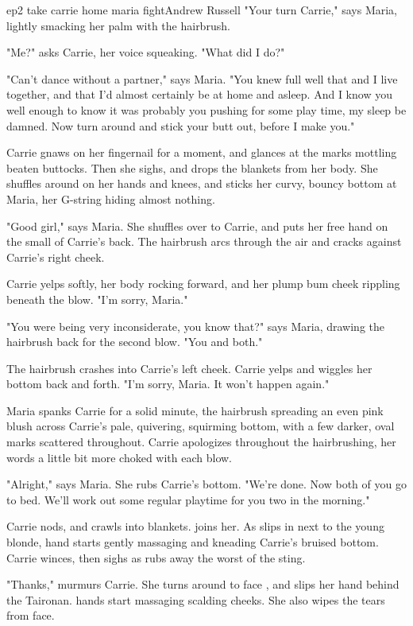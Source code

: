 \documentclass{book}
\begin{document}
\begin{childnode}{ep2 take carrie home maria fight}{Andrew Russell}
    "Your turn Carrie," says Maria, lightly smacking her palm with the hairbrush.

    "Me?" asks Carrie, her voice squeaking. "What did I do?"

    "Can't dance without a partner," says Maria. "You knew full well that \name{} and I live together, and that I'd almost certainly be at home and asleep. And I know you well enough to know it was probably you pushing for some play time, my sleep be damned. Now turn 
    around and stick your butt out, before I make you."
    
    Carrie gnaws on her fingernail for a moment, and glances at the marks mottling \names{} beaten buttocks. Then she sighs, and drops the blankets from her body. She shuffles around on her hands and knees, and sticks her curvy, bouncy bottom at Maria, her 
    G-string hiding almost nothing.
    
    "Good girl," says Maria. She shuffles over to Carrie, and puts her free hand on the small of Carrie's back. The hairbrush arcs through the air and cracks against Carrie's right cheek.

    Carrie yelps softly, her body rocking forward, and her plump bum cheek rippling beneath the blow. "I'm sorry, Maria."

    "You were being very inconsiderate, you know that?" says Maria, drawing the hairbrush back for the second blow. "You and \name{} both."

    The hairbrush crashes into Carrie's left cheek. Carrie yelps and wiggles her bottom back and forth. "I'm sorry, Maria. It won't happen again."

    Maria spanks Carrie for a solid minute, the hairbrush spreading an even pink blush across Carrie's pale, quivering, squirming bottom, with a few darker, oval marks scattered throughout. Carrie apologizes throughout the hairbrushing, her words a little bit more 
    choked with each blow.

    "Alright," says Maria. She rubs Carrie's bottom. "We're done. Now both of you go to bed. We'll work out some regular playtime for you two in the morning."

    Carrie nods, and crawls into \names{} blankets. \name{} joins her. As \heshe{} slips in next to the young blonde, \hisher{} hand starts gently massaging
    and kneading Carrie's bruised bottom. Carrie winces, then sighs as \name{} rubs away the worst of the sting.

    "Thanks," murmurs Carrie. She turns around to face \name{}, and slips her hand behind the Taironan. \HisHer{} hands start massaging \names{} scalding cheeks. She also wipes the tears from \names{} face.


\end{childnode}
\end{document}
